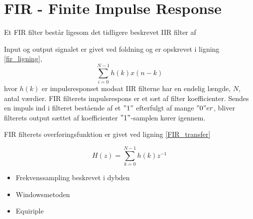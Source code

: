 \section{FIR - Finite Impulse Response}\label{sec:fir}
Et FIR filter består ligesom det tidligere beskrevet IIR filter af 

Input og output signalet er givet ved foldning og er opskrevet i ligning \ref{fir_ligning},
\begin {equation} 
\sum\limits_{i=0}^{N-1} h(k)x(n-k) \label{fir_ligning}
\end {equation}
hvor $h(k)$ er impulsresponset modsat IIR filterne har en endelig længde, $N$, antal værdier. FIR filterets impulsrespons er et sæt af filter koefficienter. Sendes en impuls ind i filteret bestående af et $"1"$ efterfulgt af mange $"0"er$, bliver filterets output sættet af koefficienter $"1"$-samplen kører igennem.


FIR filterets overføringsfunktion er givet ved ligning \ref{FIR_transfer}

\begin {equation}
H(z)=\sum\limits_{k=0}^{N-1}h(k)z^{-1} \label{FIR_transfer}
\end {equation}

\begin{itemize}
	\item Frekvenssampling beskrevet i dybden
	\item Windowsmetoden
	\item Equiriple
\end{itemize}


